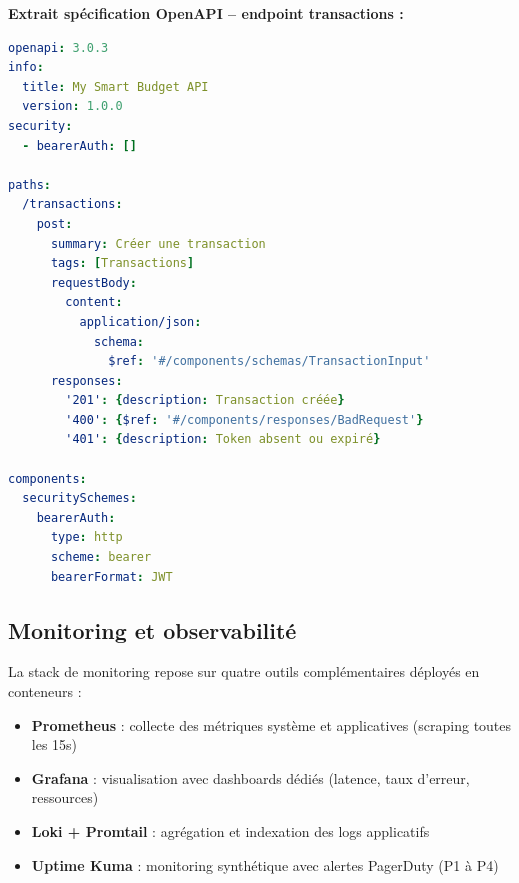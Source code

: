 \begin{exemple}
\textbf{Extrait spécification OpenAPI -- endpoint transactions :}
\begin{lstlisting}[language=yaml]
openapi: 3.0.3
info:
  title: My Smart Budget API
  version: 1.0.0
security:
  - bearerAuth: []

paths:
  /transactions:
    post:
      summary: Créer une transaction
      tags: [Transactions]
      requestBody:
        content:
          application/json:
            schema:
              $ref: '#/components/schemas/TransactionInput'
      responses:
        '201': {description: Transaction créée}
        '400': {$ref: '#/components/responses/BadRequest'}
        '401': {description: Token absent ou expiré}

components:
  securitySchemes:
    bearerAuth:
      type: http
      scheme: bearer
      bearerFormat: JWT
\end{lstlisting}
\end{exemple}

\subsection{Monitoring et observabilité}

La stack de monitoring repose sur quatre outils complémentaires déployés en conteneurs :

\begin{itemize}
    \item \textbf{Prometheus} : collecte des métriques système et applicatives (scraping toutes les 15s)
    \item \textbf{Grafana} : visualisation avec dashboards dédiés (latence, taux d'erreur, ressources)
    \item \textbf{Loki + Promtail} : agrégation et indexation des logs applicatifs
    \item \textbf{Uptime Kuma} : monitoring synthétique avec alertes PagerDuty (P1 à P4)
\end{itemize}

